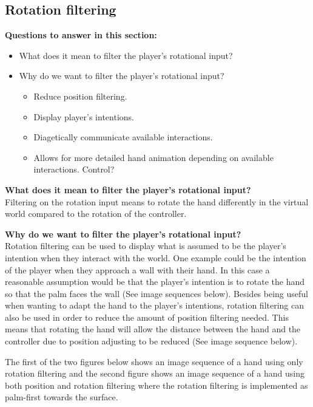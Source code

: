 
\subsection{Rotation filtering}
\label{subsec:categoryRotationFiltering}
\textbf{Questions to answer in this section:}
\begin{itemize}
\item What does it mean to filter the player's rotational input?
\item Why do we want to filter the player's rotational input?
\begin{itemize}
\item Reduce position filtering.
\item Display player's intentions.
\item Diagetically communicate available interactions.
\item Allows for more detailed hand animation depending on available interactions. Control?
\end{itemize}
\end{itemize}

\textbf{What does it mean to filter the player's rotational input?}\\
 Filtering on the rotation input means to rotate the hand differently in the virtual world compared to the rotation of the controller.

\textbf{Why do we want to filter the player's rotational input?}\\
Rotation filtering can be used to display what is assumed to be the player's intention when they interact with the world. One example could be the intention of the player when they approach a wall with their hand. In this case a reasonable assumption would be that the player's intention is to rotate the hand so that the palm faces the wall (See image sequences below). Besides being useful when wanting to adapt the hand to the player's intentions, rotation filtering can also be used in order to reduce the amount of position filtering needed. This means that rotating the hand will allow the distance between the hand and the controller due to position adjusting to be reduced (See image sequence below).

The first of the two figures below shows an image sequence of a hand using only rotation filtering and the second figure shows an image sequence of a hand using both position and rotation filtering where the rotation filtering is implemented as palm-first towards the surface.

